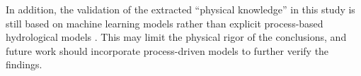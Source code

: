 In addition, the validation of the extracted “physical knowledge” in this study is still based on machine learning models rather than explicit process-based hydrological models \cite{gmd-11-3481-2018}. This may limit the physical rigor of the conclusions, and future work should incorporate process-driven models to further verify the findings.

\FloatBarrier